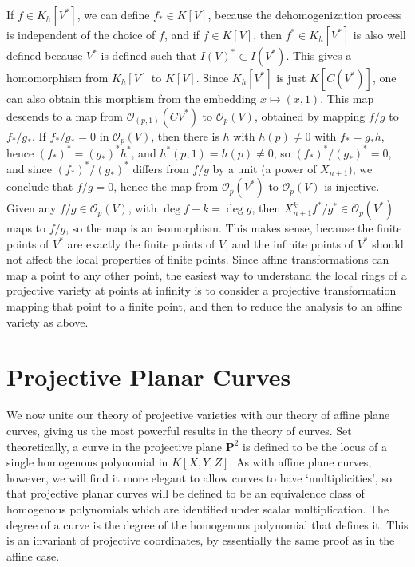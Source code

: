 If $f \in K_h[V^*]$, we can define $f_* \in K[V]$, because the dehomogenization process is independent of the choice of $f$, and if $f \in K[V]$, then $f^* \in K_h[V^*]$ is also well defined because $V^*$ is defined such that $I(V)^* \subset I(V^*)$. This gives a homomorphism from $K_h[V]$ to $K[V]$. Since $K_h[V^*]$ is just $K[C(V^*)]$, one can also obtain this morphism from the embedding $x \mapsto (x,1)$. This map descends to a map from $\mathcal{O}_{(p,1)}(CV^*)$ to $\mathcal{O}_p(V)$, obtained by mapping $f/g$ to $f_*/g_*$. If $f_*/g_* = 0$ in $\mathcal{O}_p(V)$, then there is $h$ with $h(p) \neq 0$ with $f_* = g_*h$, hence $(f_*)^* = (g_*)^* h^*$, and $h^*(p,1) = h(p) \neq 0$, so $(f_*)^*/(g_*)^* = 0$, and since $(f_*)^*/(g_*)^*$ differs from $f/g$ by a unit (a power of $X_{n+1}$), we conclude that $f/g = 0$, hence the map from $\mathcal{O}_p(V^*)$ to $\mathcal{O}_p(V)$ is injective. Given any $f/g \in \mathcal{O}_p(V)$, with $\deg f + k = \deg g$, then $X_{n+1}^kf^*/g^* \in \mathcal{O}_p(V^*)$ maps to $f/g$, so the map is an isomorphism. This makes sense, because the finite points of $V^*$ are exactly the finite points of $V$, and the infinite points of $V^*$ should not affect the local properties of finite points. Since affine transformations can map a point to any other point, the easiest way to understand the local rings of a projective variety at points at infinity is to consider a projective transformation mapping that point to a finite point, and then to reduce the analysis to an affine variety as above.

\chapter{Projective Planar Curves}

We now unite our theory of projective varieties with our theory of affine plane curves, giving us the most powerful results in the theory of curves. Set theoretically, a curve in the projective plane $\mathbf{P}^2$ is defined to be the locus of a single homogenous polynomial in $K[X,Y,Z]$. As with affine plane curves, however, we will find it more elegant to allow curves to have `multiplicities', so that projective planar curves will be defined to be an equivalence class of homogenous polynomials which are identified under scalar multiplication. The degree of a curve is the degree of the homogenous polynomial that defines it. This is an invariant of projective coordinates, by essentially the same proof as in the affine case.

